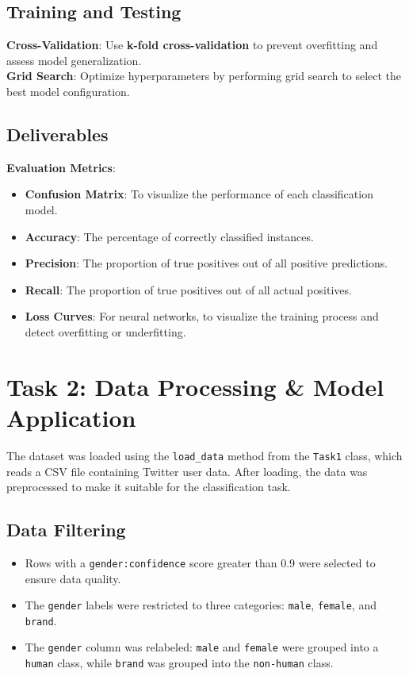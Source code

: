 \documentclass[a4paper,11pt]{article}
\begin{document}
\subsection{Training and Testing}
\textbf{Cross-Validation}: Use \textbf{k-fold cross-validation} to prevent overfitting and assess model generalization.\\
\textbf{Grid Search}: Optimize hyperparameters by performing grid search to select the best model configuration.

\subsection{Deliverables}
\textbf{Evaluation Metrics}:
\begin{itemize}
    \item \textbf{Confusion Matrix}: To visualize the performance of each classification model.
    \item \textbf{Accuracy}: The percentage of correctly classified instances.
    \item \textbf{Precision}: The proportion of true positives out of all positive predictions.
    \item \textbf{Recall}: The proportion of true positives out of all actual positives.
    \item \textbf{Loss Curves}: For neural networks, to visualize the training process and detect overfitting or underfitting.
\end{itemize}


\section{Task 2: Data Processing \& Model Application}

The dataset was loaded using the \texttt{load\_data} method from the \texttt{Task1} class, which reads a CSV file containing Twitter user data. After loading, the data was preprocessed to make it suitable for the classification task.

\subsection{Data Filtering}
\begin{itemize}
    \item Rows with a \texttt{gender:confidence} score greater than 0.9 were selected to ensure data quality.
    \item The \texttt{gender} labels were restricted to three categories: \texttt{male}, \texttt{female}, and \texttt{brand}.
    \item The \texttt{gender} column was relabeled: \texttt{male} and \texttt{female} were grouped into a \texttt{human} class, while \texttt{brand} was grouped into the \texttt{non-human} class.
\end{itemize}
\end{document}
